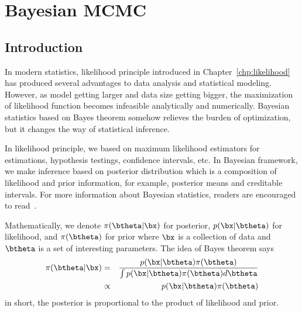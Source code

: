 \chapter{Bayesian MCMC}
\label{chp:mcmc}



\section{Introduction}

In modern statistics, likelihood principle introduced in
Chapter~\ref{chp:likelihood} has produced several advantages to data analysis
and statistical modeling. However, as model getting larger and data size
getting bigger, the maximization of likelihood function becomes infeasible
analytically and numerically. Bayesian statistics based on Bayes theorem
somehow relieves the burden of optimization, but it changes the way of
statistical inference.

In likelihood principle, we based on maximum likelihood
estimators for estimations, hypothesis testings, confidence intervals, etc.
In Bayesian framework, we make inference based on posterior distribution
which is a composition of likelihood and prior information, for example,
posterior means and creditable intervals. For more information about
Bayesian statistics, readers are encouraged to
read~\citet{Berger1993,Gelman2003}.

Mathematically, we denote $\pi(\btheta|\bx)$ for posterior, $p(\bx|\btheta)$
for likelihood, and $\pi(\btheta)$ for prior where $\bx$ is a collection of
data and $\btheta$ is a set of interesting parameters. The idea of Bayes
theorem says
\begin{eqnarray*}
\pi(\btheta|\bx)
& = & \frac{p(\bx|\btheta) \pi(\btheta)}{\int p(\bx|\btheta) \pi(\btheta) d\btheta} \\
& \propto & p(\bx|\btheta) \pi(\btheta)
\end{eqnarray*}
in short, the posterior is proportional to the product of likelihood and prior.

